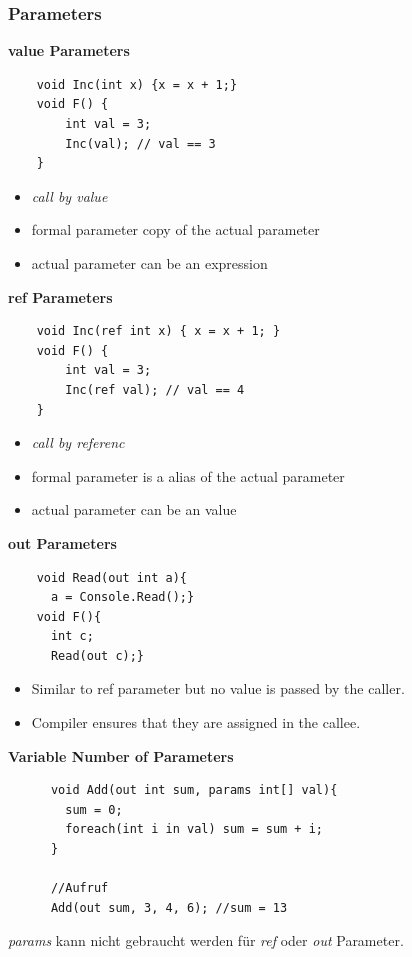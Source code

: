 \subsubsection{Parameters}

\textbf{value Parameters}
\begin{multicols}{2}
	\begin{lstlisting}
	void Inc(int x) {x = x + 1;}
	void F() {
		int val = 3;
		Inc(val); // val == 3
	}
	\end{lstlisting}
	\columnbreak
	\begin{itemize}
		\item \textit{call by value}
		\item formal parameter copy of the actual parameter
		\item actual parameter can be an expression
	\end{itemize}
\end{multicols}

\textbf{ref Parameters}
\begin{multicols}{2}
	\begin{lstlisting}
	void Inc(ref int x) { x = x + 1; }
	void F() {
		int val = 3;
		Inc(ref val); // val == 4
	}
	\end{lstlisting}
	\columnbreak
	\begin{itemize}
		\item \textit{call by referenc}
		\item formal parameter is a alias of the actual parameter
		\item actual parameter can be an value
	\end{itemize}
\end{multicols}

\textbf{out Parameters}
\begin{multicols}{2}
  \begin{lstlisting}
    void Read(out int a){
      a = Console.Read();}
    void F(){
      int c;
      Read(out c);}
  \end{lstlisting}

\columnbreak
  
  \begin{itemize}
    \item Similar to ref parameter but no value is passed by the caller.
    \item Compiler ensures that they are assigned in the callee.
  \end{itemize}
\end{multicols}

\newpage
\textbf{Variable Number of Parameters}
\begin{multicols}{2}
	\begin{lstlisting}
	  void Add(out int sum, params int[] val){
	    sum = 0;
	    foreach(int i in val) sum = sum + i;
	  }
	  
	  //Aufruf
	  Add(out sum, 3, 4, 6); //sum = 13
	\end{lstlisting}

\columnbreak

  \textit{params} kann nicht gebraucht werden für \textit{ref} oder \textit{out} Parameter.
\end{multicols}


